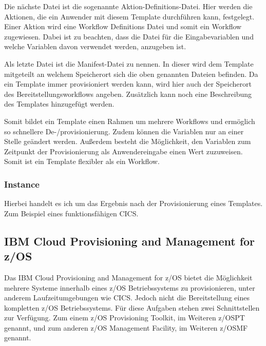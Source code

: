 Die nächste Datei ist die sogenannte Aktion-Definitions-Datei.
Hier werden die Aktionen, die ein Anwender mit diesem Template durchführen kann, festgelegt.
Einer Aktion wird eine Workflow Definitions Datei und somit ein Workflow zugewiesen.
Dabei ist zu beachten, dass die Datei für die Eingabevariablen und welche Variablen davon verwendet werden, anzugeben ist.

Als letzte Datei ist die Manifest-Datei zu nennen.
In dieser wird dem Template mitgeteilt an welchem Speicherort sich die oben genannten Dateien befinden.
Da ein Template immer provisioniert werden kann, wird hier auch der Speicherort des Bereitstellungsworkflows angeben.
Zusätzlich kann noch eine Beschreibung des Templates hinzugefügt werden.

Somit bildet ein Template einen Rahmen um mehrere Workflows und ermöglich so schnellere De-/provisionierung.
Zudem können die Variablen nur an einer Stelle geändert werden.
Außerdem besteht die Möglichkeit, den Variablen zum Zeitpunkt der Provisionierung als Anwendereingabe einen Wert zuzuweisen.
Somit ist ein Template flexibler als ein Workflow.
\cite{IBM.2019}

\subsubsection{Instance}
Hierbei handelt es ich um das Ergebnis nach der Provisionierung eines Templates.
Zum Beispiel eines funktionsfähigen CICS.

\subsection{IBM Cloud Provisioning and Management for z/OS}
Das IBM Cloud Provisioning and Management for z/OS bietet die Möglichkeit mehrere Systeme innerhalb eines z/OS Betriebssystems zu provisionieren, unter anderem Laufzeitumgebungen wie CICS.
Jedoch nicht die Bereitstellung eines kompletten z/OS Betriebssystems.
Für diese Aufgaben stehen zwei Schnittstellen zur Verfügung.
Zum einem z/OS Provisioning Toolkit, im Weiteren z/OSPT genannt, und zum anderen z/OS Management Facility, im Weiteren z/OSMF genannt.
\cite{KeithWinnardGaryPuchkoffHirenShah.2016}

